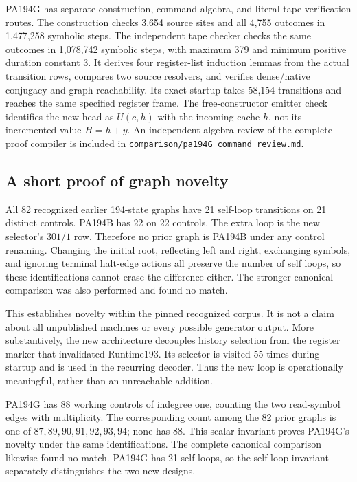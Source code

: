 \documentclass[11pt]{article}
\newcommand{\file}[1]{\nolinkurl{#1}}
\begin{document}
PA194G has separate construction, command-algebra, and literal-tape
verification routes. The construction checks 3,654 source sites and all
4,755 outcomes in 1,477,258 symbolic steps. The independent tape checker
checks the same outcomes in 1,078,742 symbolic steps, with maximum 379
and minimum positive duration constant 3. It derives four register-list
induction lemmas from the actual transition rows, compares two source
resolvers, and verifies dense/native conjugacy and graph reachability.
Its exact startup takes 58,154 transitions and reaches the same specified
register frame. The free-constructor emitter check identifies the new
head as $U(c,h)$ with the incoming cache $h$, not its incremented value
$H=h+y$. An independent algebra review of the complete proof compiler is
included in \file{comparison/pa194G_command_review.md}.

\subsection{A short proof of graph novelty}
All 82 recognized earlier 194-state graphs have 21 self-loop transitions
on 21 distinct controls. PA194B has 22 on 22 controls. The extra loop is
the new selector's \(301/1\) row. Therefore no prior graph is PA194B under
any control renaming. Changing the initial root, reflecting left and right,
exchanging symbols, and ignoring terminal halt-edge actions all preserve
the number of self loops, so these identifications cannot erase the
difference either. The stronger canonical comparison was also performed
and found no match.

This establishes novelty within the pinned recognized corpus. It is not a
claim about all unpublished machines or every possible generator output.
More substantively, the new architecture decouples history selection from
the register marker that invalidated Runtime193. Its selector is visited
55 times during startup and is used in the recurring decoder. Thus the
new loop is operationally meaningful, rather than an unreachable addition.

PA194G has 88 working controls of indegree one, counting the two read-symbol
edges with multiplicity. The corresponding count among the 82 prior graphs
is one of $87,89,90,91,92,93,94$; none has 88. This scalar invariant proves
PA194G's novelty under the same identifications. The complete canonical
comparison likewise found no match. PA194G has 21 self loops, so the
self-loop invariant separately distinguishes the two new designs.
\end{document}
